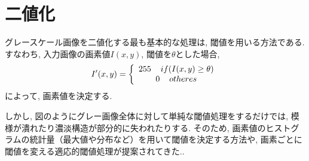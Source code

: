 \documentclass{suribt}
\begin{document}
\section{二値化}
グレースケール画像を二値化する最も基本的な処理は, 閾値を用いる方法である. すなわち, 入力画像の画素値$I(x, y)$, 閾値を$\theta$とした場合, 
\begin{equation}
	I'(x, y) = \left \{
		\begin{array}{c}
			255 \hspace{4mm} if (I(x, y) \geq \theta) \\
			 0   \hspace{4mm} otheres
		\end{array}
	\right.
\end{equation}
によって, 画素値を決定する. 

しかし, 図のようにグレー画像全体に対して単純な閾値処理をするだけでは, 模様が潰れたり濃淡構造が部分的に失われたりする. そのため, 画素値のヒストグラムの統計量（最大値や分布など）を用いて閾値を決定する方法や, 画素ごとに閾値を変える適応的閾値処理が提案されてきた.\cite{Otsu-1979, Bradley-2007}.
\end{document}
